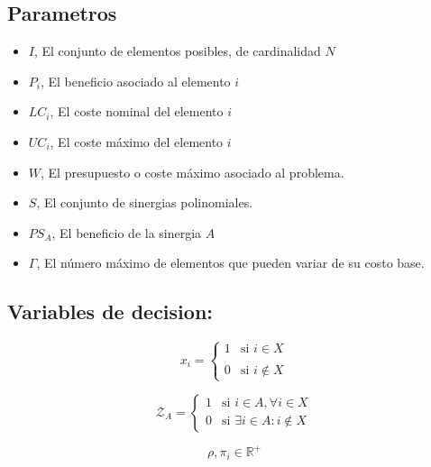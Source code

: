 \documentclass[spanish, a4paper, 12pt, openany,final]{book}
\begin{document}
    \subsection{Parametros}
     \begin{itemize}
    	\item $I$, El conjunto de elementos posibles, de cardinalidad $N$
    	\item $P_i$, El beneficio asociado al elemento $i$ %
    	\item $LC_i$, El coste nominal del elemento $i$    %
    	\item $UC_i$, El coste máximo del elemento $i$     %
    	\item $W$, El presupuesto o coste máximo asociado al problema.
    	\item $S$, El conjunto de sinergias polinomiales.
    	\item $PS_A$, El beneficio de la sinergia $A$
    	\item $\Gamma$, El número máximo de elementos que pueden variar de su costo base.
    	
    	
    \end{itemize}
    
 	\subsection{Variables de decision:}

    \begin{equation}
    	\label{equ:x_def}
    	x_i = \left\{ 
    	\begin{array}{lc}
    		1 & \text{si  $i\in X$}\\ \\ 
    		0 &  \text{si $i \notin X$}
    	\end{array} \right.
    \end{equation}
    
    \begin{equation}
    	\label{equ:z_def}
    	\mathcal{Z}_A = \left\{ 
    	\begin{array}{lc}
    		1 & \text{si  $i\in A,  \forall i \in X$}\\
    		0 &  \text{si $\exists i\in A: i \notin X$}
    	\end{array} \right.
    \end{equation}

    
    \begin{equation}
    	\label{equ:pi_def}
    	\rho,\pi_i \in \mathbb{R}^+
    \end{equation}
    
\end{document}
